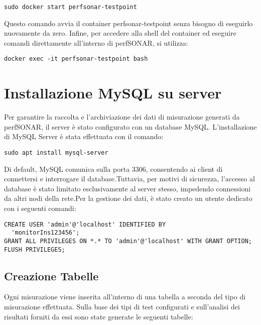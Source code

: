 \documentclass[12pt,a4paper]{report}
\begin{document}
\begin{lstlisting}
sudo docker start perfsonar-testpoint
\end{lstlisting}
Questo comando avvia il container perfsonar-testpoint senza bisogno di eseguirlo nuovamente da zero.
Infine, per accedere alla shell del container ed eseguire comandi direttamente all'interno di perfSONAR, si utilizza:
\begin{lstlisting}
docker exec -it perfsonar-testpoint bash
\end{lstlisting}












\section{Installazione MySQL su server}
Per garantire la raccolta e l’archiviazione dei dati di misurazione generati da perfSONAR, il server è stato configurato con un database MySQL. L’installazione di MySQL Server è stata effettuata con il comando:
\begin{lstlisting}
sudo apt install mysql-server
\end{lstlisting}Di default, MySQL comunica sulla porta 3306, consentendo ai client di connettersi e interrogare il database.Tuttavia, per motivi di sicurezza, l’accesso al database è stato limitato esclusivamente al server stesso, impedendo connessioni da altri nodi della rete.Per la gestione dei dati, è stato creato un utente dedicato con i seguenti comandi:

\begin{lstlisting}
CREATE USER 'admin'@'localhost' IDENTIFIED BY 
  'monitorIns123456';
GRANT ALL PRIVILEGES ON *.* TO 'admin'@'localhost' WITH GRANT OPTION;
FLUSH PRIVILEGES;
\end{lstlisting}


\subsection{Creazione Tabelle}
Ogni misurazione viene inserita all’interno di una tabella a seconda del tipo di misurazione effettuata. Sulla base dei tipi di test configurati e sull’analisi dei risultati forniti da essi sono state generate le seguenti tabelle:
\end{document}
